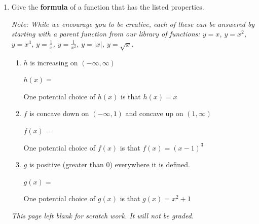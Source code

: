\documentclass{article}
\begin{document}
\begin{enumerate}
\begin{solution}
          Domain: \underline{}\\
            \vspace{0.25in}
            Range: \underline{}
    \end{solution} 
    

\item Give the \textbf{formula} of a function that has the listed properties. 

\emph{Note: While we encourage you to be creative, each of these can be answered by starting with a parent function from our library of functions: $y=x$, $y=x^2$, $y=x^3$, $y=\frac{1}{x}$, $y=\frac{1}{x^2}$, $y=|x|$, $y=\sqrt{x}$.}
\begin{enumerate}
    \item  
    \begin{problem}[\vfill]
    $h$ is increasing on $(-\infty, \infty)$
    \vspace{8pt}
    
    $h(x)=$ \fitb{2in}{}
    \end{problem}
    
    \begin{solution}
        One potential choice of $h(x)$ is that $h(x)=x$
    \end{solution}
    
   \item 
   \begin{problem}[\vfill]
   $f$ is concave down on $(-\infty, 1)$ and concave up on $(1, \infty)$
    \vspace{8pt}
       
    $f(x)=$ \fitb{2in}{}
    \end{problem}

       \begin{solution}
        One potential choice of $f(x)$ is that $f(x)=(x-1)^3$
    \end{solution}
    
    \item 
    \begin{problem}[\vfill] $g$ is positive (greater than 0) everywhere it is defined.
    \vspace{8pt}
    
    $g(x)=$ \fitb{2in}{}
    \end{problem}

       \begin{solution}
        One potential choice of $g(x)$ is that $g(x)=x^2+1$
    \end{solution}
    
\end{enumerate}


\newpage
\emph{This page left blank for scratch work. It will not be graded.}
\end{enumerate}
\end{document}
